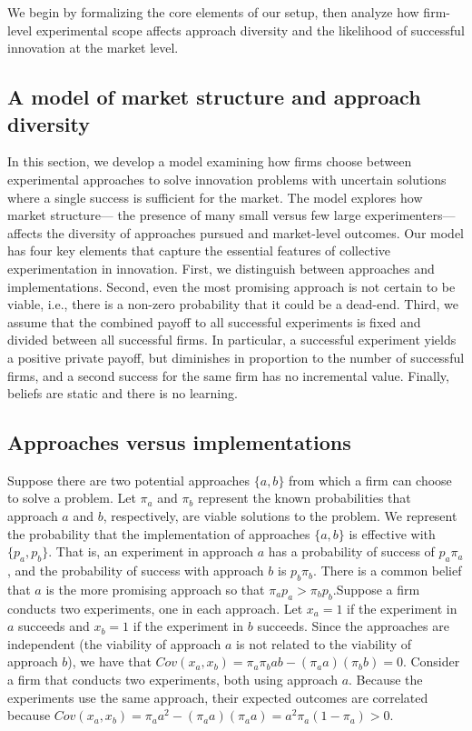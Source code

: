 We begin by formalizing the core elements of our setup, then analyze how firm-level experimental scope affects approach diversity and the likelihood of successful innovation at the market level.

\subsection{A model of market structure and approach diversity}

In this section, we develop a model examining how firms choose between experimental approaches to solve innovation problems with uncertain solutions where a single success is sufficient for the market. The model explores how market structure--- the presence of many small versus few large experimenters---affects the diversity of approaches pursued and market-level outcomes. Our model has four key elements that capture the essential features of collective experimentation in innovation. First, we distinguish between approaches and implementations. Second, even the most promising approach is not certain to be viable, i.e., there is a non-zero probability that it could be a dead-end. Third, we assume that the combined payoff to all successful experiments is fixed and divided between all successful firms. In particular, a successful experiment yields a positive private payoff, but diminishes in proportion to the number of successful firms, and a second success for the same firm has no incremental value. Finally, beliefs are static and there is no learning.

\subsection{Approaches versus implementations}

Suppose there are two potential approaches $\{a, b\}$ from which a firm can choose to solve a problem. Let $\pi_a$ and $\pi_b$ represent the known probabilities that approach $a$ and $b$, respectively, are viable solutions to the problem. We represent the probability that the implementation of approaches $\{a, b\}$ is effective with $\{p_a, p_b\}$. That is, an experiment in approach $a$ has a probability of success of $p_a\pi_a$, and the probability of success with approach $b$ is $p_b\pi_b$. There is a common belief that $a$ is the more promising approach so that $\pi_a p_a> \pi_b p_b$.Suppose a firm conducts two experiments, one in each approach. Let $x_a=1$ if the experiment in $a$ succeeds and $x_b=1$ if the experiment in $b$ succeeds. Since the approaches are independent (the viability of approach $a$ is not related to the viability of approach $b$), we have that  $    Cov(x_a, x_b) = \pi_a \pi_b a b - (\pi_a a)(\pi_b b) = 0     $. Consider a firm that conducts two experiments, both using approach $a$. Because the experiments use the same approach, their expected outcomes are correlated because $Cov(x_a, x_b) = \pi_a a^2 - (\pi_a a)(\pi_a a) = a^2 \pi_a (1-\pi_a) > 0$.

